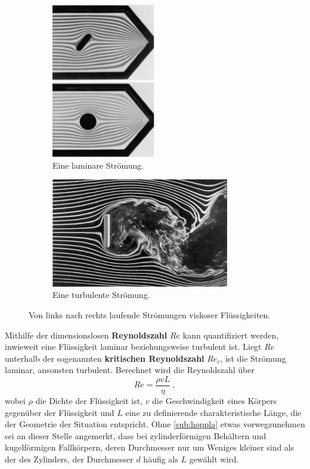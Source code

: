 \begin{figure}
    \centering
    \begin{subfigure}{0.48\textwidth}
        \centering
        \includegraphics[height=6.75cm]{plots/demtr2.jpeg}
        \caption{Eine laminare Strömung\protect\cite{demtroeder}.}
        \label{fig:laminar}
    \end{subfigure}
    \begin{subfigure}{0.48\textwidth}
        \centering
        \includegraphics[height=4.75cm]{plots/demtr1.jpeg}
        \caption{Eine turbulente Strömung\protect\cite{demtroeder}.}
        \label{fig:turbo}
    \end{subfigure}
    \caption{Von links nach rechts laufende Strömungen viskoser Flüssigkeiten.}
    \label{fig:lamturb}
\end{figure}

Mithilfe der dimensionslosen \textbf{Reynoldszahl} $Re$ kann quantifiziert werden, inwieweit eine Flüssigkeit laminar beziehungsweise 
turbulent ist. 
Liegt $Re$ unterhalb der sogenannten \textbf{kritischen Reynoldszahl} $Re_c$, ist die Strömung laminar, ansonsten turbulent. 
Berechnet wird die Reynoldszahl über
\begin{equation}
    Re=\frac{\rho v L}{\eta} \:,
    \label{eqn:reynold}
\end{equation} 
wobei $\rho$ die Dichte der Flüssigkeit ist, $v$ die Geschwindigkeit eines Körpers gegenüber der Flüssigkeit und $L$ eine 
zu definierende charakteristische Länge, die der Geometrie der Situation entspricht. 
Ohne \ref{sub:hoppla} etwas vorwegzunehmen sei an dieser Stelle angemerkt, dass bei zylinderförmigen Behältern und kugelförmigen 
Fallkörpern, deren Durchmesser nur um Weniges kleiner sind als der des Zylinders, der Durchmesser $d$ häufig als $L$ gewählt wird. 

